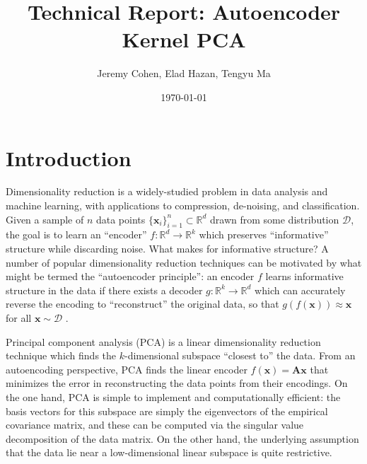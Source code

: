\documentclass[]{article}
\newcommand{\reals}{\mathbb{R}}
\begin{document}
\title{Technical Report: Autoencoder Kernel PCA}
\author{Jeremy Cohen, Elad Hazan, Tengyu Ma}
\date{\today}
\maketitle

\section{Introduction}
Dimensionality reduction is a widely-studied problem in data analysis and machine learning, with applications to compression, de-noising, and classification.
Given a sample of $n$ data points $\{\mathbf{x}_i\}_{i=1}^n \subset \reals^d$ drawn from some distribution $\mathcal{D}$, the goal is to learn an ``encoder'' $f: \reals^d \to \reals^k$ which preserves ``informative'' structure while discarding noise.
What makes for informative structure?
A number of popular dimensionality reduction techniques can be motivated by what might be termed the ``autoencoder principle'': an encoder $f$ learns informative structure in the data if there exists a decoder $g: \reals^k \to \reals^d$ which can accurately reverse the encoding to ``reconstruct'' the original data, so that $g(f(\mathbf{x})) \approx \mathbf{x}$ for all $\mathbf{x} \sim \mathcal{D}$ \cite{hazan2016}.

Principal component analysis (PCA) is a linear dimensionality reduction technique which finds the $k$-dimensional subspace ``closest to'' the data.
From an autoencoding perspective, PCA finds the linear encoder $f(\mathbf{x}) = \mathbf{A} \mathbf{x}$ that minimizes the error in reconstructing the data points from their encodings.
On the one hand, PCA is simple to implement and computationally efficient: the basis vectors for this subspace are simply the eigenvectors of the empirical covariance matrix, and these can be computed via the singular value decomposition of the data matrix.
On the other hand, the underlying assumption that the data lie near a low-dimensional linear subspace is quite restrictive.
\end{document}
